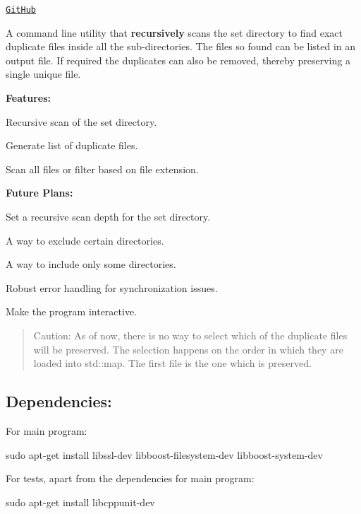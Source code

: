 \href{https://github.com/vishal-wadhwa/Duplicate-File-Remover}{\tt Git\+Hub}

A command line utility that {\bfseries recursively} scans the set directory to find exact duplicate files inside all the sub-\/directories. The files so found can be listed in an output file. If required the duplicates can also be removed, thereby preserving a single unique file.

\href{https://asciinema.org/a/14}{\tt }

{\bfseries Features\+:}
\begin{DoxyEnumerate}
\item Recursive scan of the set directory.
\item Generate list of duplicate files.
\item Scan all files or filter based on file extension.
\end{DoxyEnumerate}

{\bfseries Future Plans\+:}
\begin{DoxyEnumerate}
\item Set a recursive scan depth for the set directory.
\item A way to exclude certain directories.
\item A way to include only some directories.
\item Robust error handling for synchronization issues.
\item Make the program interactive.
\end{DoxyEnumerate}

\begin{quote}
Caution\+: As of now, there is no way to select which of the duplicate files will be preserved. The selection happens on the order in which they are loaded into {\ttfamily std\+::map}. The first file is the one which is preserved. \end{quote}


\subsection*{\label{_dep}%
Dependencies\+:}


\begin{DoxyEnumerate}
\item For main program\+:

{\ttfamily sudo apt-\/get install libssl-\/dev libboost-\/filesystem-\/dev libboost-\/system-\/dev}
\item For tests, apart from the dependencies for main program\+:

{\ttfamily sudo apt-\/get install libcppunit-\/dev}
\end{DoxyEnumerate}

